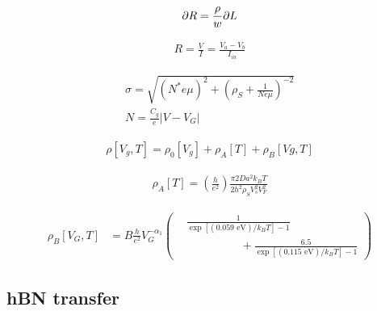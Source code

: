 \documentclass[../Matt_Gebert_Honours_Thesis.tex]{subfiles}
\begin{document}
\begin{align}
	\partial R = \frac{\rho}{w} \partial L
\end{align}

\begin{align}
	R = \frac{V}{I} = \frac{V_a-V_b}{I_{in}}
\end{align}

\begin{align}
	\sigma = \sqrt{\left(N^* e \mu\right)^2 + \left(\rho_S + \frac{1}{N e \mu}\right)^{-2}}\\
	N = \frac{C_g}{e} \left|V-V_G\right|
\end{align}

\begin{align}
	\rho[V_g,T] = \rho_0[V_g] + \rho_A[T] + \rho_B[Vg,T]
\end{align}

\begin{align}
	\rho_A[T] = \left(\frac{h}{e^2}\right) \frac{\pi2 Da^2 k_B T}{2 h^2 \rho_S V_s^2 V_F^2}
\end{align}

\begin{align}
\rho_B[V_G,T]&= B \frac{h}{e^2} V_G^{-\alpha_1} \left(\begin{aligned}
&\frac{1}{\exp\left[(0.059\text{ eV})/k_B T\right]-1}\\ &\hspace{2cm}+\frac{6.5}{\exp\left[(0.115\text{ eV})/k_B T\right]-1}
\end{aligned}\right)
\end{align}

\subsection{hBN transfer}
\end{document}
